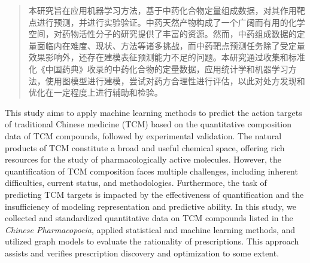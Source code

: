 

\begin{abstract}
  本研究旨在应用机器学习方法，基于中药化合物定量组成数据，对其作用靶点进行预测，并进行实验验证。中药天然产物构成了一个广阔而有用的化学空间，对药物活性分子的研究提供了丰富的资源。然而，中药组成数据的定量面临内在难度、现状、方法等诸多挑战，而中药靶点预测任务除了受定量效果影响外，还存在建模表征预测能力不足的问题。本研究通过收集和标准化《中国药典》收录的中药化合物的定量数据，应用统计学和机器学习方法，使用图模型进行建模，尝试对药方合理性进行评估，以此对处方发现和优化在一定程度上进行辅助和检验。

\end{abstract}

\begin{abstract*}
  This study aims to apply machine learning methods to predict the action targets of traditional Chinese medicine (TCM) based on the quantitative composition data of TCM compounds, followed by experimental validation. The natural products of TCM constitute a broad and useful chemical space, offering rich resources for the study of pharmacologically active molecules. However, the quantification of TCM composition faces multiple challenges, including inherent difficulties, current status, and methodologies. Furthermore, the task of predicting TCM targets is impacted by the effectiveness of quantification and the insufficiency of modeling representation and predictive ability. In this study, we collected and standardized quantitative data on TCM compounds listed in the \textit{Chinese Pharmacopoeia}, applied statistical and machine learning methods, and utilized graph models to evaluate the rationality of prescriptions. This approach assists and verifies prescription discovery and optimization to some extent.

\end{abstract*}
